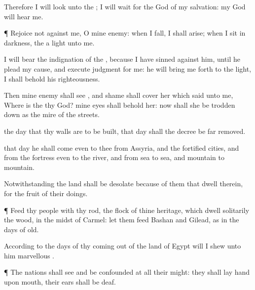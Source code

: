 {\par }{\PP {}Therefore I will
look unto the
{}; I will
wait for the
God of my
salvation: my
God will
hear me.


\par }{\PP {}¶
Rejoice not against me, O mine
enemy: when I
fall, I shall
arise; when I
sit in
darkness, the
{}
{} a
light unto me.

I will
bear the
indignation of the
{}, because I have
sinned against him, until he
plead my
cause, and
execute
judgment for me: he will bring me
forth to the
light,
{} I shall
behold his
righteousness.

Then
{} mine
enemy shall
see
{}, and
shame shall
cover her which
said unto me, Where is the
{} thy
God? mine
eyes shall
behold her: now shall she be trodden
down as the
mire of the
streets.

 the
day that thy
walls are to be
built,
{} that
day shall the
decree be far
removed.

 that
day
{} he shall
come even to thee from
Assyria, and
{} the
fortified
cities, and from the
fortress even to the
river, and from
sea to
sea, and
{}
mountain to
mountain.

Notwithstanding the
land shall be
desolate because of them that
dwell therein, for the
fruit of their
doings.


\par }{\PP {}¶
Feed thy
people with thy
rod, the
flock of thine
heritage, which
dwell
solitarily
{} the
wood, in the
midst of
Carmel: let them
feed
{}
Bashan and
Gilead, as in the
days of
old.

According to the
days of thy
coming out of the
land of
Egypt will I
shew unto him
marvellous
{}.


\par }{\PP {}¶ The
nations shall
see and be
confounded at all their
might: they shall
lay
{}
hand upon
{}
mouth, their
ears shall be
deaf.

}
